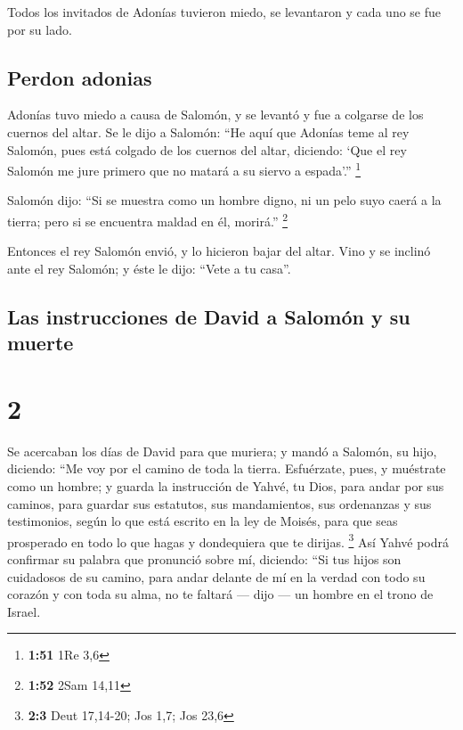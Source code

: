  Todos los invitados de Adonías tuvieron miedo, se
levantaron y cada uno se fue por su lado.

\hypertarget{perdon-adonias}{%
\subsection{Perdon adonias}\label{perdon-adonias}}

 Adonías tuvo miedo a causa de Salomón, y se levantó y
fue a colgarse de los cuernos del altar.  Se le dijo a
Salomón: ``He aquí que Adonías teme al rey Salomón, pues está colgado de
los cuernos del altar, diciendo: `Que el rey Salomón me jure primero que
no matará a su siervo a espada'.'' \footnote{\textbf{1:51} 1Re 3,6}

 Salomón dijo: ``Si se muestra como un hombre digno, ni
un pelo suyo caerá a la tierra; pero si se encuentra maldad en él,
morirá.'' \footnote{\textbf{1:52} 2Sam 14,11}

 Entonces el rey Salomón envió, y lo hicieron bajar del
altar. Vino y se inclinó ante el rey Salomón; y éste le dijo: ``Vete a
tu casa''.

\hypertarget{las-instrucciones-de-david-a-salomuxf3n-y-su-muerte}{%
\subsection{Las instrucciones de David a Salomón y su
muerte}\label{las-instrucciones-de-david-a-salomuxf3n-y-su-muerte}}

\hypertarget{section-1}{%
\section{2}\label{section-1}}

 Se acercaban los días de David para que muriera; y mandó
a Salomón, su hijo, diciendo:  ``Me voy por el camino de
toda la tierra. Esfuérzate, pues, y muéstrate como un hombre;
 y guarda la instrucción de Yahvé, tu Dios, para andar por
sus caminos, para guardar sus estatutos, sus mandamientos, sus
ordenanzas y sus testimonios, según lo que está escrito en la ley de
Moisés, para que seas prosperado en todo lo que hagas y dondequiera que
te dirijas. \footnote{\textbf{2:3} Deut 17,14-20; Jos 1,7; Jos 23,6}
 Así Yahvé podrá confirmar su palabra que pronunció sobre
mí, diciendo: ``Si tus hijos son cuidadosos de su camino, para andar
delante de mí en la verdad con todo su corazón y con toda su alma, no te
faltará --- dijo --- un hombre en el trono de Israel.

